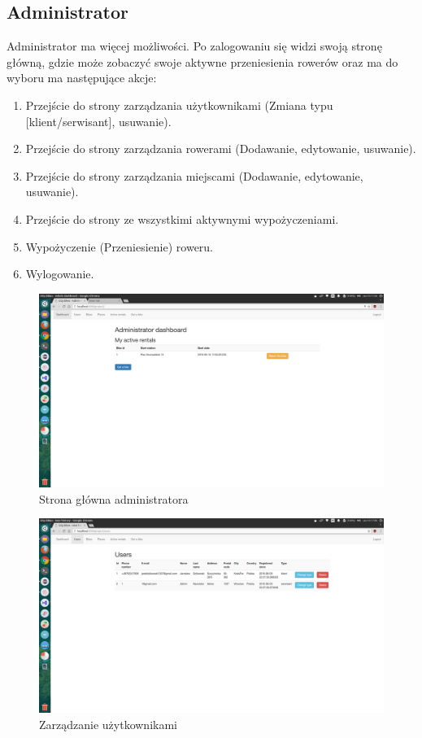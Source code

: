 \documentclass{article}
\begin{document}
\subsection{Administrator}
Administrator ma więcej możliwości. Po zalogowaniu się widzi swoją stronę główną,
gdzie może zobaczyć swoje aktywne przeniesienia rowerów oraz ma do wyboru ma następujące akcje:
\begin{enumerate}
	\item Przejście do strony zarządzania użytkownikami (Zmiana typu [klient/serwisant], usuwanie).
	\item Przejście do strony zarządzania rowerami (Dodawanie, edytowanie, usuwanie).
	\item Przejście do strony zarządzania miejscami (Dodawanie, edytowanie, usuwanie).
	\item Przejście do strony ze wszystkimi aktywnymi wypożyczeniami.
	\item Wypożyczenie (Przeniesienie) roweru.
	\item Wylogowanie.
\end{enumerate}
\begin{figure}[p]
\centerline{
	\includegraphics[width=\paperwidth, height=\paperheight, keepaspectratio]{screenshots/admindashboard.png}}
	\caption{Strona główna administratora}
\end{figure}
\begin{figure}[p]
\centerline{
	\includegraphics[width=\paperwidth, height=\paperheight, keepaspectratio]{screenshots/adminusers.png}}
	\caption{Zarządzanie użytkownikami}
\end{figure}
\end{document}
